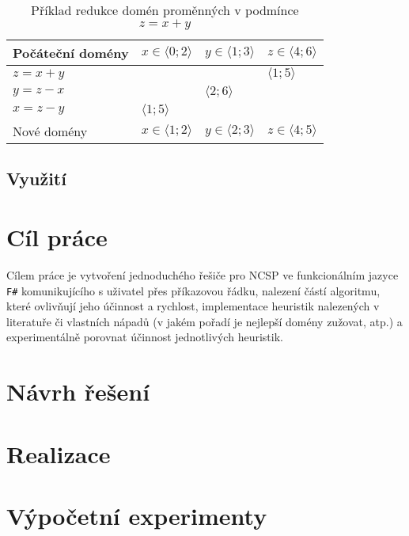 \documentclass[thesis=B,czech]{FITthesis}[2012/06/26]
\theoremstyle{definition}
\begin{document}
\begin{table}[ht]
\centering
\label{narrowingTable}
\begin{tabular}{|l|l|l|l|}
\hline
 Počáteční domény & $x \in \langle 0;2 \rangle$ & $y \in \langle 1;3 \rangle$ & $z \in \langle 4;6 \rangle$  \\ \hline
 $z = x+y$  &  & &  $\langle 1;5 \rangle$  \\ \hline
 $y = z-x$  & & $\langle 2;6 \rangle$  &  \\ \hline
 $x = z-y$  & $\langle 1;5 \rangle$  &  &  \\ \hline
 Nové domény & $x \in \langle 1;2 \rangle$ & $y \in \langle 2;3 \rangle$ & $z \in \langle 4;5 \rangle$ \\ \hline
\end{tabular}
\caption{Příklad redukce domén proměnných v podmínce $z = x + y$}
\end{table}

\section{Využití}


\chapter{Cíl práce}
Cílem práce je vytvoření jednoduchého řešiče pro NCSP ve funkcionálním jazyce \texttt{F\#} komunikujícího s uživatel přes příkazovou řádku, nalezení částí algoritmu, které ovlivňují jeho účinnost a rychlost, implementace heuristik nalezených v literatuře či vlastních nápadů (v jakém pořadí je nejlepší domény zužovat, atp.) a experimentálně porovnat účinnost jednotlivých heuristik.


\chapter{Návrh řešení}
\chapter{Realizace}
\chapter{Výpočetní experimenty}

\begin{conclusion}
\end{conclusion}



\end{document}
